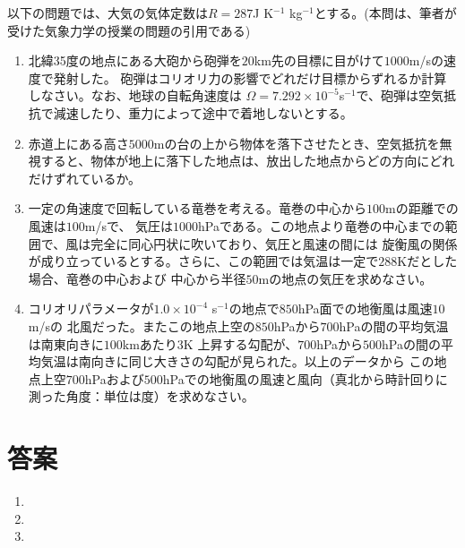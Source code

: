 \documentclass{jsarticle}
\newenvironment{problems}
{
  \renewcommand\labelenumi{\doublebox{\arabic{enumi}}}
  \begin{enumerate}
}{
  \end{enumerate}
  \renewcommand\labelenumi{\arabic{enumi}.}
}
\begin{document}
\begin{problems}
        以下の問題では、大気の気体定数は${R = 287}$J K$^{-1}$ kg$^{-1}$とする。(本問は、筆者が受けた気象力学の授業の問題の引用である)
        \begin{enumerate}[(1)]
        \item 北緯35度の地点にある大砲から砲弾を${20}$km先の目標に目がけて${1000}$m/sの速度で発射した。
            砲弾はコリオリ力の影響でどれだけ目標からずれるか計算しなさい。なお、地球の自転角速度は
            ${\Omega = 7.292 \times 10^{-5}}$s$^{-1}$で、砲弾は空気抵抗で減速したり、重力によって途中で着地しないとする。
        \item 赤道上にある高さ${5000}$mの台の上から物体を落下させたとき、空気抵抗を無視すると、物体が地上に落下した地点は、放出した地点からどの方向にどれだけずれているか。
        \item 一定の角速度で回転している竜巻を考える。竜巻の中心から${100}$mの距離での風速は${100}$m/sで、
            気圧は${1000}$hPaである。この地点より竜巻の中心までの範囲で、風は完全に同心円状に吹いており、気圧と風速の間には
            旋衡風の関係が成り立っているとする。さらに、この範囲では気温は一定で${288}$Kだとした場合、竜巻の中心および
            中心から半径${50}$mの地点の気圧を求めなさい。
        \item コリオリパラメータが${1.0 \times 10^{-4}}$ s$^{-1}$の地点で${850}$hPa面での地衡風は風速${10}$m/sの
            北風だった。またこの地点上空の${850}$hPaから${700}$hPaの間の平均気温は南東向きに${100}$kmあたり${3}$K
            上昇する勾配が、${700}$hPaから${500}$hPaの間の平均気温は南向きに同じ大きさの勾配が見られた。以上のデータから
            この地点上空${700}$hPaおよび${500}$hPaでの地衡風の風速と風向（真北から時計回りに測った角度：単位は度）を求めなさい。
        \end{enumerate}

\end{problems}

\section{答案}
\begin{problems}
\item 

\item 

\item 

\end{problems}
\end{document}
